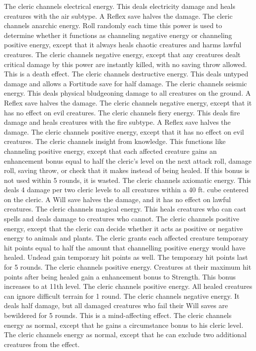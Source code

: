  The cleric channels electrical energy. This deals electricity damage and heals creatures with the air subtype. A Reflex save halves the damage.
 The cleric channels anarchic energy. Roll randomly each time this power is used to determine whether it functions as channeling negative energy or channeling positive energy, except that it always heals chaotic creatures and harms lawful creatures.
 The cleric channels negative energy, except that any creatures dealt critical damage by this power are instantly killed, with no saving throw allowed. This is a death effect.
 The cleric channels destructive energy. This deals untyped damage and allows a Fortitude save for half damage.
 The cleric channels seismic energy. This deals physical bludgeoning damage to all creatures on the ground. A Reflex save halves the damage.
 The cleric channels negative energy, except that it has no effect on evil creatures.
 The cleric channels fiery energy. This deals fire damage and heals creatures with the fire subtype. A Reflex save halves the damage.
 The cleric channels positive energy, except that it has no effect on evil creatures.
 The cleric channels insight from knowledge. This functions like channeling positive energy, except that each affected creature gains an enhancement bonus equal to half the cleric's level on the next attack roll, damage roll, saving throw, or check that it makes instead of being healed. If this bonus is not used within 5 rounds, it is wasted.
 The cleric channels axiomatic energy. This deals 4 damage per two cleric levels to all creatures within a 40 ft. cube centered on the cleric. A Will save halves the damage, and it has no effect on lawful creatures.
 The cleric channels magical energy. This heals creatures who can cast spells and deals damage to creatures who cannot.
 The cleric channels positive energy, except that the cleric can decide whether it acts as positive or negative energy to animals and plants.
 The cleric grants each affected creature temporary hit points equal to half the amount that channelling positive energy would have healed. Undead gain temporary hit points as well. The temporary hit points last for 5 rounds.
 The cleric channels positive energy. Creatures at their maximum hit points after being healed gain a  enhancement bonus to Strength. This bonus increases to  at 11th level.
 The cleric channels positive energy. All healed creatures can ignore difficult terrain for 1 round.
 The cleric channels negative energy. It deals half damage, but all damaged creatures who fail their Will saves are bewildered for 5 rounds. This is a mind-affecting effect.
 The cleric channels energy as normal, except that he gains a  circumstance bonus to his cleric level.
 The cleric channels energy as normal, except that he can exclude two additional creatures from the effect.

